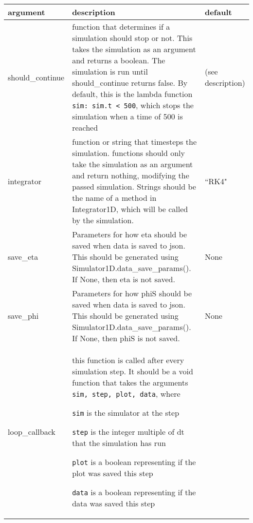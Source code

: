 \documentclass[10pt,a4paper]{article}
\newenvironment{optarglist}
    {\begin{center}
    \begin{tabular}{l|p{10cm}|l}
    argument & description & default\\
    \hline
    }
    { 
    \end{tabular} 
    \end{center}
    }
\begin{document}
\begin{optarglist}
should\_continue &
                   function that determines if a simulation should stop or
                    not. This takes the simulation as an argument and returns a
                    boolean. The simulation is run until should\_continue
                    returns false. By default, this is the lambda function
                    \texttt{sim: sim.t < 500}, which stops the simulation when a time of 500 is reached & (see description)\\\hline
integrator &
function or string that timesteps the simulation.
                    functions should only take the simulation as an argument
                    and return nothing, modifying the passed simulation.
                    Strings should be the name of a method in Integrator1D,
                    which will be called by the simulation. &
                    ``RK4" \\\hline

save\_eta &
                   Parameters for how eta should be saved when data is saved to json.
                    This should be generated using
                    Simulator1D.data\_save\_params(). If None, then eta is not
                    saved. & None\\\hline
        
        save\_phi &
                   Parameters for how phiS should be saved when data is saved to json.
                    This should be generated using
                    Simulator1D.data\_save\_params(). If None, then phiS is not
                    saved. & None\\\hline

        loop\_callback &
                   this function is called after every simulation step. It
                    should be a void function that takes the arguments
                    \texttt{sim, step, plot, data}, where

                    \texttt{sim} is the simulator at the step

                    \texttt{step} is the integer multiple of dt that the simulation
                    has run

                    \texttt{plot} is a boolean representing if the plot was saved this
                    step

                    \texttt{data} is a boolean representing if the data was saved this
                    step
                    

\end{optarglist}
\end{document}
